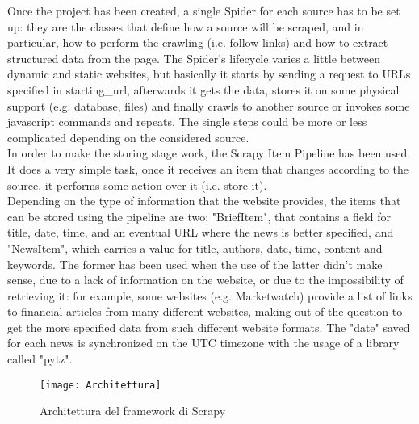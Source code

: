 Once the project has been created, a single Spider \cite{scrapyspider} for each source has to be set up: they are the classes that define how a source will be scraped, and in particular, how to perform the crawling (i.e. follow links) and how to extract structured data from the page. The Spider's lifecycle varies a little between dynamic and static websites, but basically it starts by sending a request to URLs specified in starting\_url, afterwards it gets the data, stores it on some physical support (e.g. database, files) and finally crawls to another source or invokes some javascript commands and repeats. The single steps could be more or less complicated depending on the considered source. \\
In order to make the storing stage work, the Scrapy Item Pipeline \cite{scrapypipeline} has been used. It does a very simple task, once it receives an item that changes according to the source, it performs some action over it (i.e. store it).\\
Depending on the type of information that the website provides, the items that can be stored using the pipeline are two: "BriefItem", that contains a field for title, date, time, and an eventual URL where the news is better specified, and "NewsItem", which carries a value for title, authors, date, time, content and keywords. The former has been used when the use of the latter didn't make sense, due to a lack of information on the website, or due to the impossibility of retrieving it: for example, some websites (e.g. Marketwatch) provide a list of links to financial articles from many different websites, making out of the question to get the more specified data from such different website formats. The "date" saved for each news is synchronized on the UTC timezone with the usage of a library called "pytz".

\begin{figure}[H]
\centering
\texttt{[image: Architettura]}
\caption{Architettura del framework di Scrapy}\label{fig:1}
\end{figure}

